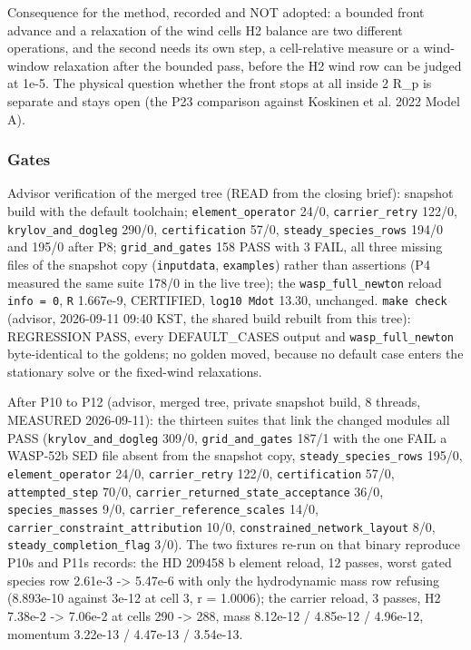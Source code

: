 \documentclass[english,a4paper]{my_memo}
\begin{document}
Consequence for the method, recorded and NOT adopted: a bounded front advance
and a relaxation of the wind cells\textquotesingle{} H2 balance are two different operations,
and the second needs its own step, a cell-relative measure or a wind-window
relaxation after the bounded pass, before the H2 wind row can be judged at
1e-5. The physical question whether the front stops at all inside 2 R\_p is
separate and stays open (the P23 comparison against Koskinen et al. 2022
Model A).

\subsubsection{Gates}\label{gates}

Advisor verification of the merged tree (READ from the closing brief):
snapshot build with the default toolchain; \texttt{element\_operator} 24/0,
\texttt{carrier\_retry} 122/0, \texttt{krylov\_and\_dogleg} 290/0, \texttt{certification} 57/0,
\texttt{steady\_species\_rows} 194/0 and 195/0 after P8; \texttt{grid\_and\_gates} 158 PASS
with 3 FAIL, all three missing files of the snapshot copy (\texttt{inputdata},
\texttt{examples}) rather than assertions (P4 measured the same suite 178/0 in the
live tree); the \texttt{wasp\_full\_newton} reload \texttt{info\ =\ 0}, \texttt{\textbar{}\textbar{}R\textbar{}\textbar{}} 1.667e-9,
CERTIFIED, \texttt{log10\ Mdot} 13.30, unchanged. \texttt{make\ check} (advisor, 2026-09-11 09:40 KST, the shared build rebuilt from this tree): REGRESSION PASS, every DEFAULT\_CASES output and \texttt{wasp\_full\_newton} byte-identical to the goldens; no golden moved, because no default case enters the stationary solve or the fixed-wind relaxations.

After P10 to P12 (advisor, merged tree, private snapshot build, 8 threads,
MEASURED 2026-09-11): the thirteen suites that link the changed modules all
PASS (\texttt{krylov\_and\_dogleg} 309/0, \texttt{grid\_and\_gates} 187/1 with the one FAIL a
WASP-52b SED file absent from the snapshot copy, \texttt{steady\_species\_rows} 195/0,
\texttt{element\_operator} 24/0, \texttt{carrier\_retry} 122/0, \texttt{certification} 57/0,
\texttt{attempted\_step} 70/0, \texttt{carrier\_returned\_state\_acceptance} 36/0,
\texttt{species\_masses} 9/0, \texttt{carrier\_reference\_scales} 14/0,
\texttt{carrier\_constraint\_attribution} 10/0, \texttt{constrained\_network\_layout} 8/0,
\texttt{steady\_completion\_flag} 3/0). The two fixtures re-run on that binary
reproduce P10\textquotesingle s and P11\textquotesingle s records: the HD 209458 b element reload, 12 passes,
worst gated species row 2.61e-3 -\textgreater{} 5.47e-6 with only the hydrodynamic mass
row refusing (8.893e-10 against 3e-12 at cell 3, r = 1.0006); the carrier
reload, 3 passes, H2 7.38e-2 -\textgreater{} 7.06e-2 at cells 290 -\textgreater{} 288, mass 8.12e-12 /
4.85e-12 / 4.96e-12, momentum 3.22e-13 / 4.47e-13 / 3.54e-13.
\end{document}
